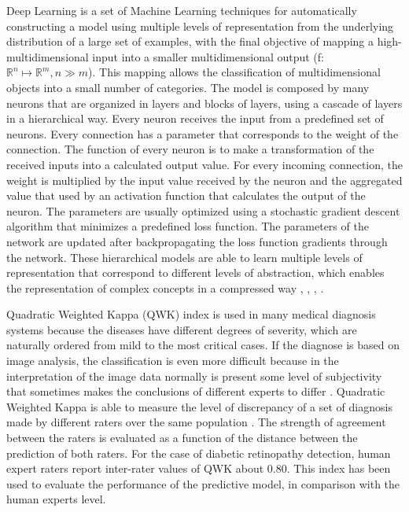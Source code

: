 \documentclass{dcsm}
\begin{document}
Deep Learning is a set of Machine Learning techniques 
for automatically constructing a model using multiple levels of representation from the underlying distribution of a large set of examples, with the final objective of mapping a high-multidimensional input into a smaller multidimensional output (f: $\mathbb{R}^{n} 
\mapsto \mathbb{R}^{m}, n \gg m$). 
This mapping allows the classification of multidimensional objects into a small number of categories. The model is composed by many neurons that are organized in layers and blocks of layers, using a cascade of layers in a hierarchical way. Every neuron receives the input from a predefined set of neurons. Every connection has a parameter that corresponds to the weight of the connection. 
The function of every neuron is to make a transformation of the received inputs into a calculated output value. For every incoming connection, the weight is multiplied by the input value received by the neuron and the aggregated value that used by an activation function that calculates the output of the neuron. The parameters are usually optimized using a stochastic gradient descent algorithm that minimizes a predefined loss function. The parameters of the network are updated after backpropagating the loss function gradients through the network. These hierarchical models are able to learn multiple levels of representation that correspond to different levels of abstraction, which enables the representation of complex concepts in a compressed way \cite{nature-deep-learning}, \cite{888}, \cite{Bengio:2013:RLR:2498740.2498889}, \cite{bengio-2009}.

Quadratic Weighted Kappa (QWK) index is used in many medical diagnosis systems because the diseases have different degrees of severity, which are naturally ordered from mild to the most critical cases. If the diagnose is based on image analysis, the classification is even more difficult because in the interpretation of the image data normally is present some level of subjectivity that sometimes makes the conclusions of different experts to differ \cite{hripcsak2002measuring}. Quadratic Weighted Kappa is able to measure the level of discrepancy of a set of diagnosis made by different raters over the same population \cite{viera2005understanding}. The strength of agreement between the raters is evaluated as a function of the distance between the prediction of both raters. For the case of diabetic retinopathy detection, human expert raters report inter-rater values of QWK about 0.80. This index has been used to evaluate the performance of the predictive model, in comparison with the human experts level.
\end{document}
